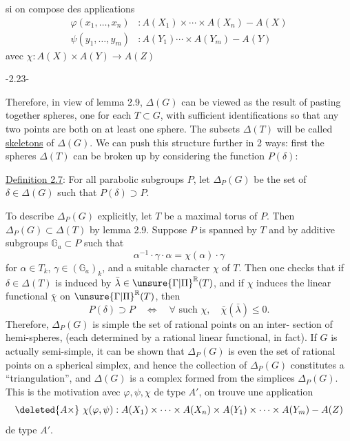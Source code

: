     si on compose des applications
\[
\begin{aligned}
\varphi(x_1,\ldots,x_n)&:A(X_1)\times\cdots\times A(X_n)-A(X)\\
\psi(y_1,\ldots,y_m)&:A(Y_1)\cdots\times A(Y_m)-A(Y)
\end{aligned}
\]
\deleted{\unsure{-}} avec $\chi:A(X)\times A(Y)\longrightarrow A(Z)$
\begin{center}-2.23-\end{center}
Therefore, in view of lemma 2.9, $\Delta(G)$ can be viewed as the result of pasting together spheres, one for each $T\subset G$, with sufficient identifications so that any two points are both on at least one sphere. The subsets $\Delta(T)$ will be called \uline{skeletons} of $\Delta(G)$. We can push this structure further in 2 ways: first the spheres $\Delta(T)$ can be broken up by considering the function $P(\delta)$:

\uline{Definition 2.7}: For all parabolic subgroups $P$, let $\Delta_P(G)$ be the set of $\delta\in\Delta(G)$ such that $P(\delta)\supset P$.

To describe $\Delta_P(G)$ explicitly, let $T$ be a maximal torus of $P$. Then $\Delta_P(G)\subset\Delta(T)$ by lemma 2.9. Suppose $P$ is spanned by $T$ and by additive subgroups $\mathbb G_a\subset P$ such that
\[
\alpha^{-1}\cdot\gamma\cdot\alpha=\chi(\alpha)\cdot\gamma
\]
for $\alpha\in T_k$, $\gamma\in(\mathbb G_a)_k$, and a suitable character $\chi$ of $T$. Then one checks that if $\delta\in\Delta(T)$ is induced by $\bar\lambda\in\unsure{\Gamma|\Pi}^{\mathbb R}(T)$, and if $\chi$ induces the linear functional $\bar\chi$ on $\unsure{\Gamma|\Pi}^{\mathbb R}(T)$, then
\[
P(\delta)\supset P\quad\Longleftrightarrow\quad\forall\text{ such }\chi,\quad\bar\chi(\bar\lambda)\leq0.
\]
Therefore, $\Delta_P(G)$ is simple the set of rational points on an inter-
section of hemi-spheres, (each determined by a rational linear functional, in fact). If $G$ is actually semi-simple, it can be shown that $\Delta_P(G)$ is even the set of rational points on a spherical simplex, and hence the collection of $\Delta_P(G)$ constitutes a ``triangulation'', and $\Delta(G)$ is a complex formed from the simplices $\Delta_P(G)$. This is the motivation
avec $\varphi,\psi,\chi$ de type $A'$, on trouve une application
\[
\deleted{A\times}\ \chi(\varphi,\psi):A(X_1)\times\cdots\times A(X_n)\times A(Y_1)\times\cdots\times A(Y_m)-A(Z)
\]
de type $A'$.


